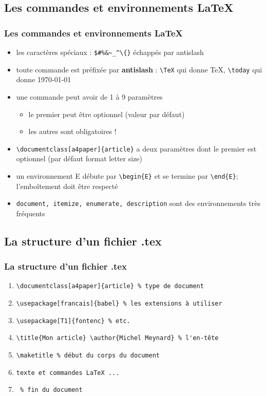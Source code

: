 \subsection{Les commandes et environnements \LaTeX}
\begin{frame}[fragile]
\frametitle{Les commandes et environnements \LaTeX}

\begin{itemize}
\item les caractères spéciaux : \verb|$#%&~_^\{}| échappés par antislash
\item toute commande est préfixée par \textbf{antislash} : \verb_\TeX_ qui donne \TeX, \verb_\today_ qui donne \today
\item une commande peut avoir de 1 à 9 paramètres 
  \begin{itemize}
  \item le premier peut être optionnel (valeur par défaut)
  \item les autres sont obligatoires !
  \end{itemize}
\item \verb_\documentclass[a4paper]{article}_ a deux paramètres dont le premier
  est optionnel (par défaut format letter size)
\item un environnement E débute par \verb_\begin{E}_ et se termine par
    \verb_\end{E}_; l'emboîtement doit être respecté %
\item \texttt{document, itemize, enumerate, description} sont des environnements
  très fréquents
\end{itemize}

\end{frame}


\subsection{La structure d'un fichier .tex}
\begin{frame}[fragile]
\frametitle{La structure d'un fichier .tex}

\begin{enumerate}
\item \verb_\documentclass[a4paper]{article} % type de document_
\item \verb_\usepackage[francais]{babel} % les extensions à utiliser_
\item \verb_\usepackage[T1]{fontenc} % etc._
\item \verb_\title{Mon article} \author{Michel Meynard} % l'en-tête_
\item \verb_\maketitle % début du corps du document_
\item \verb_texte et commandes LaTeX ..._
\item \verb_ % fin du document_
\end{enumerate}

\end{frame}




 

